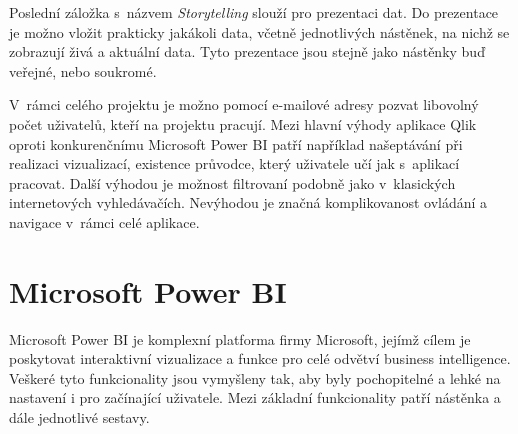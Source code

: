 \documentclass[czech,master]{diploma}
\begin{document}
Poslední záložka s~názvem \textit{Storytelling} slouží pro prezentaci dat. Do prezentace je možno vložit prakticky jakákoli data, včetně jednotlivých nástěnek, na nichž se zobrazují živá a aktuální data. Tyto prezentace jsou stejně jako nástěnky buď veřejné, nebo soukromé.

V~rámci celého projektu je možno pomocí e-mailové adresy pozvat libovolný počet uživatelů, kteří na projektu pracují. Mezi hlavní výhody aplikace Qlik oproti konkurenčnímu Microsoft Power BI patří například našeptávání při realizaci vizualizací, existence průvodce, který uživatele učí jak s~aplikací pracovat. Další výhodou je možnost filtrovaní podobně jako v~klasických internetových vyhledávačích. Nevýhodou je značná komplikovanost ovládání a navigace v~rámci celé aplikace.

\section{Microsoft Power BI}
\label{sec:microsoft_power_bi}
Microsoft Power BI je komplexní platforma firmy Microsoft, jejímž cílem je poskytovat interaktivní vizualizace a funkce pro celé odvětví business intelligence. Veškeré tyto funkcionality jsou vymyšleny tak, aby byly pochopitelné a lehké na nastavení i pro začínající uživatele. Mezi základní funkcionality patří nástěnka a dále jednotlivé sestavy.
\end{document}
